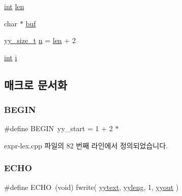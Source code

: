 \begin{DoxyCompactItemize}
\item 
\mbox{\hyperlink{_util_8cpp_a0ef32aa8672df19503a49fab2d0c8071}{int}} \mbox{\hyperlink{expr-lex_8cpp_afed088663f8704004425cdae2120b9b3}{len}}
\item 
char $\ast$ \mbox{\hyperlink{expr-lex_8cpp_aaaf5379ca5750ed4ef26a247cca0103c}{buf}}
\item 
\mbox{\hyperlink{expr-lex_8cpp_aa14cc3d400000eef0cd40225fd790cfe}{yy\+\_\+size\+\_\+t}} \mbox{\hyperlink{expr-lex_8cpp_aeab71244afb687f16d8c4f5ee9d6ef0e}{n}} = \mbox{\hyperlink{expr-lex_8cpp_afed088663f8704004425cdae2120b9b3}{len}} + 2
\item 
\mbox{\hyperlink{_util_8cpp_a0ef32aa8672df19503a49fab2d0c8071}{int}} \mbox{\hyperlink{expr-lex_8cpp_acb559820d9ca11295b4500f179ef6392}{i}}
\end{DoxyCompactItemize}


\subsection{매크로 문서화}
\mbox{\label{expr-lex_8cpp_ab766bbbee08d04b67e3fe599d6900873}} 
\subsubsection{\texorpdfstring{B\+E\+G\+IN}{BEGIN}}
{\footnotesize\ttfamily \#define B\+E\+G\+IN~yy\+\_\+start = 1 + 2 $\ast$}



expr-\/lex.\+cpp 파일의 82 번째 라인에서 정의되었습니다.

\mbox{\label{expr-lex_8cpp_aad1dc60a04a1d8cfc8b3ded13601e361}} 
\subsubsection{\texorpdfstring{E\+C\+HO}{ECHO}}
{\footnotesize\ttfamily \#define E\+C\+HO~(void) fwrite( \mbox{\hyperlink{expr_node_8cpp_ad9264b77d56b6971f29739e2bda77f51}{yytext}}, \mbox{\hyperlink{expr-lex_8cpp_a1b5865350b5ca5c1d69f429c2a652953}{yyleng}}, 1, \mbox{\hyperlink{expr-lex_8cpp_a296847b42b0baa62e2af36cb79f3c0eb}{yyout}} )}




